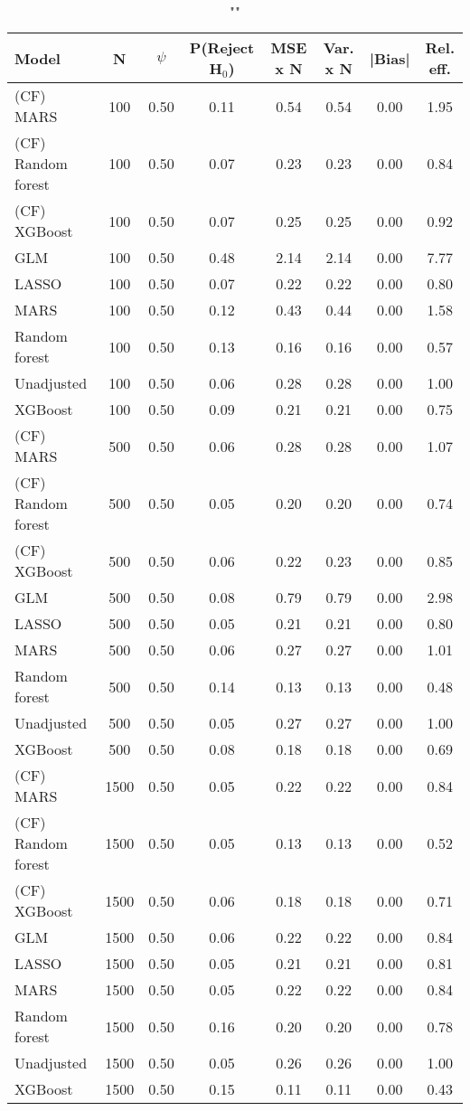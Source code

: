 \begin{table}
\centering
\caption{""}
\begin{tabular}{lccccccc}
\toprule
Model & N & $\psi$ & P(Reject H$_0$) & MSE x N & Var. x N & |Bias| & Rel. eff.\\ \midrule
(CF) MARS & 100 & 0.50 & 0.11 & 0.54 & 0.54 & 0.00 & 1.95 \\ 
(CF) Random forest & 100 & 0.50 & 0.07 & 0.23 & 0.23 & 0.00 & 0.84 \\ 
(CF) XGBoost & 100 & 0.50 & 0.07 & 0.25 & 0.25 & 0.00 & 0.92 \\ 
GLM & 100 & 0.50 & 0.48 & 2.14 & 2.14 & 0.00 & 7.77 \\ 
LASSO & 100 & 0.50 & 0.07 & 0.22 & 0.22 & 0.00 & 0.80 \\ 
MARS & 100 & 0.50 & 0.12 & 0.43 & 0.44 & 0.00 & 1.58 \\ 
Random forest & 100 & 0.50 & 0.13 & 0.16 & 0.16 & 0.00 & 0.57 \\ 
Unadjusted & 100 & 0.50 & 0.06 & 0.28 & 0.28 & 0.00 & 1.00 \\ 
XGBoost & 100 & 0.50 & 0.09 & 0.21 & 0.21 & 0.00 & 0.75 \\ \addlinespace 
(CF) MARS & 500 & 0.50 & 0.06 & 0.28 & 0.28 & 0.00 & 1.07 \\ 
(CF) Random forest & 500 & 0.50 & 0.05 & 0.20 & 0.20 & 0.00 & 0.74 \\ 
(CF) XGBoost & 500 & 0.50 & 0.06 & 0.22 & 0.23 & 0.00 & 0.85 \\ 
GLM & 500 & 0.50 & 0.08 & 0.79 & 0.79 & 0.00 & 2.98 \\ 
LASSO & 500 & 0.50 & 0.05 & 0.21 & 0.21 & 0.00 & 0.80 \\ 
MARS & 500 & 0.50 & 0.06 & 0.27 & 0.27 & 0.00 & 1.01 \\ 
Random forest & 500 & 0.50 & 0.14 & 0.13 & 0.13 & 0.00 & 0.48 \\ 
Unadjusted & 500 & 0.50 & 0.05 & 0.27 & 0.27 & 0.00 & 1.00 \\ 
XGBoost & 500 & 0.50 & 0.08 & 0.18 & 0.18 & 0.00 & 0.69 \\ \addlinespace 
(CF) MARS & 1500 & 0.50 & 0.05 & 0.22 & 0.22 & 0.00 & 0.84 \\ 
(CF) Random forest & 1500 & 0.50 & 0.05 & 0.13 & 0.13 & 0.00 & 0.52 \\ 
(CF) XGBoost & 1500 & 0.50 & 0.06 & 0.18 & 0.18 & 0.00 & 0.71 \\ 
GLM & 1500 & 0.50 & 0.06 & 0.22 & 0.22 & 0.00 & 0.84 \\ 
LASSO & 1500 & 0.50 & 0.05 & 0.21 & 0.21 & 0.00 & 0.81 \\ 
MARS & 1500 & 0.50 & 0.05 & 0.22 & 0.22 & 0.00 & 0.84 \\ 
Random forest & 1500 & 0.50 & 0.16 & 0.20 & 0.20 & 0.00 & 0.78 \\ 
Unadjusted & 1500 & 0.50 & 0.05 & 0.26 & 0.26 & 0.00 & 1.00 \\ 
XGBoost & 1500 & 0.50 & 0.15 & 0.11 & 0.11 & 0.00 & 0.43 \\
\bottomrule
\end{tabular}
\end{table}

